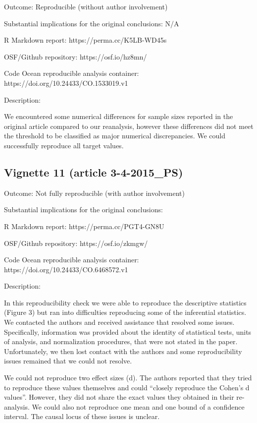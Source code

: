 \begin{appendix}
Outcome: Reproducible (without author involvement)

Substantial implications for the original conclusions: N/A

R Markdown report: https://perma.cc/K5LB-WD45s

OSF/Github repository: https://osf.io/hz8mn/

Code Ocean reproducible analysis container:
https://doi.org/10.24433/CO.1533019.v1

Description:

We encountered some numerical differences for sample sizes reported in
the original article compared to our reanalysis, however these
differences did not meet the threshold to be classified as major
numerical discrepancies. We could successfully reproduce all target
values.

\hypertarget{vignette-11-article-3-4-2015_ps}{%
\subsection{Vignette 11 (article
3-4-2015\_PS)}\label{vignette-11-article-3-4-2015_ps}}

Outcome: Not fully reproducible (with author involvement)

Substantial implications for the original conclusions:

R Markdown report: https://perma.cc/PGT4-GN8U

OSF/Github repository: https://osf.io/zkmgw/

Code Ocean reproducible analysis container:
https://doi.org/10.24433/CO.6468572.v1

Description:

In this reproducibility check we were able to reproduce the descriptive
statistics (Figure 3) but ran into difficulties reproducing some of the
inferential statistics. We contacted the authors and received assistance
that resolved some issues. Specifically, information was provided about
the identity of statistical tests, units of analysis, and normalization
procedures, that were not stated in the paper. Unfortunately, we then
lost contact with the authors and some reproducibility issues remained
that we could not resolve.

We could not reproduce two effect sizes (d). The authors reported that
they tried to reproduce these values themselves and could ``closely
reproduce the Cohen's d values''. However, they did not share the exact
values they obtained in their re-analysis. We could also not reproduce
one mean and one bound of a confidence interval. The causal locus of
these issues is unclear.


\end{appendix}
